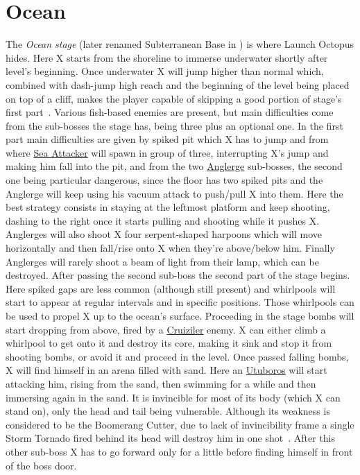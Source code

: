 \section{Ocean}
The \textit{Ocean stage} (later renamed Subterranean Base in \mhx) is where Launch Octopus hides. Here X starts from the shoreline to immerse underwater shortly after level's beginning. Once underwater X will jump higher than normal which, combined with dash-jump high reach and the beginning of the level being placed on top of a cliff, makes the player capable of skipping a good portion of stage's first part~\cite{stratwiki:Ocean}. Various fish-based enemies are present, but main difficulties come from the sub-bosses the stage has, being three plus an optional one. In the first part main difficulties are given by spiked pit which X has to jump and from where \hyperlink{enem:Sea_Attacker}{Sea Attacker} will spawn in group of three, interrupting X's jump and making him fall into the pit, and from the two \hyperlink{miniboss:Anglerge}{Anglerge} sub-bosses, the second one being particular dangerous, since the floor has two spiked pits and the Anglerge will keep using his vacuum attack to push/pull X into them. Here the best strategy consists in staying at the leftmost platform and keep shooting, dashing to the right once it starts pulling and shooting while it pushes X. Anglerges will also shoot X four serpent-shaped harpoons which will move horizontally and then fall/rise onto X when they're above/below him. Finally Anglerges will rarely shoot a beam of light from their lamp, which can be destroyed. After passing the second sub-boss the second part of the stage begins. Here spiked gaps are less common (although still present) and whirlpools will start to appear at regular intervals and in specific positions. Those whirlpools can be used to propel X up to the ocean's surface. Proceeding in the stage bombs will start dropping from above, fired by a \hyperlink{miniboss:Cruiziler}{Cruiziler} enemy. X can either climb a whirlpool to get onto it and destroy its core, making it sink and stop it from shooting bombs, or avoid it and proceed in the level. Once passed falling bombs, X will find himself in an arena filled with sand. Here an \hyperlink{miniboss:Utuboros}{Utuboros} will start attacking him, rising from the sand, then swimming for a while and then immersing again in the sand. It is invincible for most of its body (which X can stand on), only the head and tail being vulnerable. Although its weakness is considered to be the Boomerang Cutter, due to lack of invincibility frame a single Storm Tornado fired behind its head will destroy him in one shot~\cite{wiki:Utuboros}. After this other sub-boss X has to go forward only for a little before finding himself in front of the boss door.


